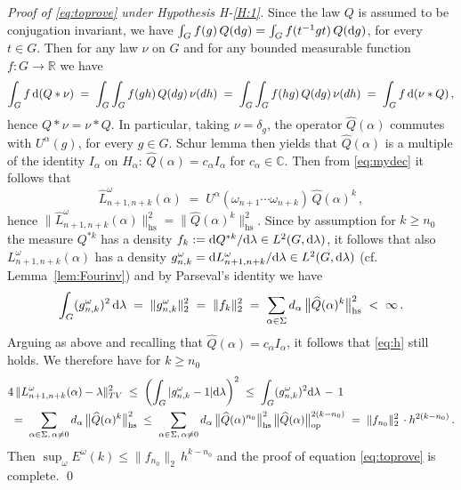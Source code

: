 \documentclass[a4paper,reqno,11pt]{amsart}
\numberwithin{equation}{section}
\newcommand{\ga}{\alpha}
\newcommand{\gd}{\delta}
\newcommand{\gl}{\lambda}
\newcommand{\go}{\omega}
\newcommand{\dd}{\text{\rm d}}             %
\newcommand{\R}{\mathbb{R}}
\newcommand{\C}{\mathbb{C}}
\newcommand{\somb}{\widehat} %
\begin{document}
\noindent
{\it Proof of \eqref{eq:toprove} under
Hypothesis H-\ref{H:1}.}
Since the law $Q$ is assumed to be conjugation invariant, we have
$\int_G f(g) \, Q(\dd g) = \int_G f(t^{-1} g t) \, Q(\dd g)$,
for every $t \in G$. Then for any law
$\nu$ on $G$ and for any bounded measurable function $f:G \to \R$ we have
\begin{equation}
\int_G f \, \dd (Q*\nu) \;=\; \int_G \int_G f(gh) \, Q(dg) \, \nu(dh) \;=\; \int_G \int_G
f(hg) \, Q(dg) \, \nu(dh) \;=\; \int_G f \, \dd (\nu*Q) \,,
\end{equation}
hence $Q * \nu = \nu * Q$. In particular, taking $\nu = \gd_g$,
the operator $\somb Q(\alpha)$ commutes with $U^\alpha(g)$, for every $g\in G$.
Schur lemma then yields that $\somb Q(\alpha)$ is a
multiple of the identity $I_\alpha$ on $H_\alpha$: $\somb Q(\alpha) =
c_\alpha I_\alpha$ for $c_\ga \in \C$.
Then from \eqref{eq:mydec} it follows that
\begin{equation}
\somb L^\go_{n+1,n+k}(\alpha)  \;=\;
U^\alpha(\go_{n+1} \cdots \go_{n+k}) \,
\somb Q(\alpha)^{k} \,,
\end{equation}
hence $\|\somb L^\go_{n+1,n+k}(\alpha)\|^2_{\mathrm{hs}}
= \|\somb Q(\alpha)^{k} \|^{2}_{\mathrm{hs}}$.
Since by assumption for $k \ge n_0$ the measure $Q^{*k}$ has a density
$f_k := \dd Q^{*k} / \dd \gl \in L^2(G,\dd \gl)$,
it follows that also $L^\go_{n+1,n+k}(\alpha)$
has a density $g^\go_{n,k} = \dd L^\go_{n+1,n+k} / \dd \gl \in L^2(G,\dd \gl)$
(cf. Lemma~\ref{lem:Fourinv})
and by Parseval's identity we have
\begin{equation*}
	\int_G (g^\go_{n,k})^2 \, \dd \gl \;=\;
	\| g^\go_{n,k} \|_2^2 \;=\; \| f_k \|_2^2
	\;=\; \sum_{\ga \in \Sigma}
	d_\ga \, \big\| \somb{Q}(\ga)^k \big\|_{\text{hs}}^2 \;<\; \infty \,.
\end{equation*}
Arguing as above and recalling that $\somb Q(\ga) = c_\ga I_\ga$,
it follows that \eqref{eq:h} still holds.
We therefore have for $k \ge n_0$
\begin{equation}
\begin{split}
 & 4\, \|L^\go_{n+1,n+k}(\alpha) - \lambda\|^2_{TV}
\;\le\; \left( \int_G |g^\go_{n,k} - 1| \dd \gl \right)^2
\;\le\; \int_G (g^\go_{n,k})^2 \dd \gl \,-\, 1 \\
& \;=\; \sum_{\alpha \in \Sigma, \, \ga \ne 0}
d_{\alpha} \, \big\|\somb Q(\alpha)^{k} \big\|^{2}_{\mathrm{hs}}
\;\le\; \sum_{\alpha \in \Sigma, \, \ga \ne 0}
d_{\alpha} \, \big\| \somb Q(\alpha)^{n_0} \big\|^{2}_{\mathrm{hs}} \,
\big\| \somb Q(\alpha) \big\|^{2 (k-n_0)}_{\mathrm{op}}  \;=\; \| f_{n_0} \|_2^2 \,  \cdot
h^{2 (k-n_0)} \,.
\end{split}
\end{equation}
Then $\sup_\go E^\go(k) \le \| f_{n_0} \|_2 \,
h^{k-n_0}$ and the proof
of equation \eqref{eq:toprove} is complete.
\qed
\end{document}
